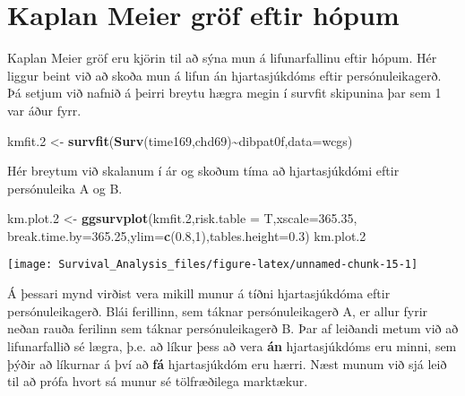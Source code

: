 \documentclass[
]{book}
\newenvironment{Shaded}{\begin{snugshade}}{\end{snugshade}}
\newcommand{\DataTypeTok}[1]{\textcolor[rgb]{0.13,0.29,0.53}{#1}}
\newcommand{\DecValTok}[1]{\textcolor[rgb]{0.00,0.00,0.81}{#1}}
\newcommand{\FloatTok}[1]{\textcolor[rgb]{0.00,0.00,0.81}{#1}}
\newcommand{\KeywordTok}[1]{\textcolor[rgb]{0.13,0.29,0.53}{\textbf{#1}}}
\newcommand{\NormalTok}[1]{#1}
\newcommand{\OperatorTok}[1]{\textcolor[rgb]{0.81,0.36,0.00}{\textbf{#1}}}
\newcommand{\StringTok}[1]{\textcolor[rgb]{0.31,0.60,0.02}{#1}}
\begin{document}
\hypertarget{kaplan-meier-gruxf6f-eftir-huxf3pum}{%
\section{Kaplan Meier gröf eftir hópum}\label{kaplan-meier-gruxf6f-eftir-huxf3pum}}

Kaplan Meier gröf eru kjörin til að sýna mun á lifunarfallinu eftir hópum. Hér liggur beint við að skoða mun á lifun án hjartasjúkdóms eftir persónuleikagerð. Þá setjum við nafnið á þeirri breytu hægra megin í survfit skipunina þar sem 1 var áður fyrr.

\begin{Shaded}
\begin{Highlighting}[]
\NormalTok{kmfit}\FloatTok{.2}\NormalTok{ <{-}}\StringTok{ }\KeywordTok{survfit}\NormalTok{(}\KeywordTok{Surv}\NormalTok{(time169,chd69)}\OperatorTok{\textasciitilde{}}\NormalTok{dibpat0f,}\DataTypeTok{data=}\NormalTok{wcgs)}
\end{Highlighting}
\end{Shaded}

Hér breytum við skalanum í ár og skoðum tíma að hjartasjúkdómi eftir persónuleika A og B.

\begin{Shaded}
\begin{Highlighting}[]
\NormalTok{km.plot}\FloatTok{.2}\NormalTok{ <{-}}\StringTok{ }\KeywordTok{ggsurvplot}\NormalTok{(kmfit}\FloatTok{.2}\NormalTok{,}\DataTypeTok{risk.table =}\NormalTok{ T,}\DataTypeTok{xscale=}\FloatTok{365.35}\NormalTok{,}
                        \DataTypeTok{break.time.by=}\FloatTok{365.25}\NormalTok{,}\DataTypeTok{ylim=}\KeywordTok{c}\NormalTok{(}\FloatTok{0.8}\NormalTok{,}\DecValTok{1}\NormalTok{),}\DataTypeTok{tables.height=}\FloatTok{0.3}\NormalTok{) }
\NormalTok{km.plot}\FloatTok{.2} 
\end{Highlighting}
\end{Shaded}

\texttt{[image: Survival\_Analysis\_files/figure-latex/unnamed-chunk-15-1]}

Á þessari mynd virðist vera mikill munur á tíðni hjartasjúkdóma eftir persónuleikagerð. Blái ferillinn, sem táknar persónuleikagerð A, er allur fyrir neðan rauða ferilinn sem táknar persónuleikagerð B. Þar af leiðandi metum við að lifunarfallið sé lægra, þ.e. að líkur þess að vera \textbf{án} hjartasjúkdóms eru minni, sem þýðir að líkurnar á því að \textbf{fá} hjartasjúkdóm eru hærri. Næst munum við sjá leið til að prófa hvort sá munur sé tölfræðilega marktækur.
\end{document}
